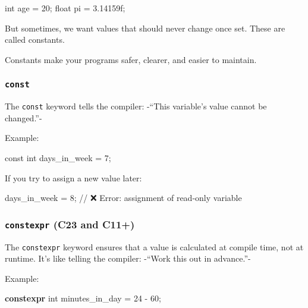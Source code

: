 \documentclass[
  letterpaper,
  DIV=11,
  numbers=noendperiod]{scrreprt}
\newenvironment{Shaded}{\begin{snugshade}}{\end{snugshade}}
\newcommand{\BuiltInTok}[1]{\textcolor[rgb]{0.00,0.23,0.31}{#1}}
\newcommand{\CommentTok}[1]{\textcolor[rgb]{0.37,0.37,0.37}{#1}}
\newcommand{\DataTypeTok}[1]{\textcolor[rgb]{0.68,0.00,0.00}{#1}}
\newcommand{\DecValTok}[1]{\textcolor[rgb]{0.68,0.00,0.00}{#1}}
\newcommand{\FloatTok}[1]{\textcolor[rgb]{0.68,0.00,0.00}{#1}}
\newcommand{\KeywordTok}[1]{\textcolor[rgb]{0.00,0.23,0.31}{\textbf{#1}}}
\newcommand{\NormalTok}[1]{\textcolor[rgb]{0.00,0.23,0.31}{#1}}
\newcommand{\OperatorTok}[1]{\textcolor[rgb]{0.37,0.37,0.37}{#1}}
\begin{document}
\begin{Shaded}
\begin{Highlighting}[]
\DataTypeTok{int}\NormalTok{ age }\OperatorTok{=} \DecValTok{20}\OperatorTok{;}
\DataTypeTok{float}\NormalTok{ pi }\OperatorTok{=} \FloatTok{3.14159}\BuiltInTok{f}\OperatorTok{;}
\end{Highlighting}
\end{Shaded}

But sometimes, we want values that should never change once set. These
are called constants.

Constants make your programs safer, clearer, and easier to maintain.

\subsubsection{\texorpdfstring{\texttt{const}}{const}}\label{const}

The \texttt{const} keyword tells the compiler: -``This variable's value
cannot be changed.''-

Example:

\begin{Shaded}
\begin{Highlighting}[]
\DataTypeTok{const} \DataTypeTok{int}\NormalTok{ days\_in\_week }\OperatorTok{=} \DecValTok{7}\OperatorTok{;}
\end{Highlighting}
\end{Shaded}

If you try to assign a new value later:

\begin{Shaded}
\begin{Highlighting}[]
\NormalTok{days\_in\_week }\OperatorTok{=} \DecValTok{8}\OperatorTok{;}   \CommentTok{// ❌ Error: assignment of read{-}only variable}
\end{Highlighting}
\end{Shaded}

\subsubsection{\texorpdfstring{\texttt{constexpr} (C23 and
C11+)}{constexpr (C23 and C11+)}}\label{constexpr-c23-and-c11}

The \texttt{constexpr} keyword ensures that a value is calculated at
compile time, not at runtime. It's like telling the compiler: -``Work
this out in advance.''-

Example:

\begin{Shaded}
\begin{Highlighting}[]
\KeywordTok{constexpr} \DataTypeTok{int}\NormalTok{ minutes\_in\_day }\OperatorTok{=} \DecValTok{24} \OperatorTok{{-}} \DecValTok{60}\OperatorTok{;}
\end{Highlighting}
\end{Shaded}
\end{document}
